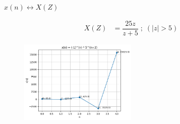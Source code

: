 \documentclass[journal,12pt,twocolumn]{IEEEtran}
\theoremstyle{remark}
\begin{document}
\begin{center}
$x(n) \longleftrightarrow X(Z)$
\end{center}


 \begin{align}
	   X(Z) &= \dfrac{25z}{z+5} \; ; \;( |z| > 5 )
 \end{align}


\begin{figure}
  \centering
  \includegraphics[width=0.5\textwidth]{figures/grasi2.png} 
 
\end{figure}
\end{document}
